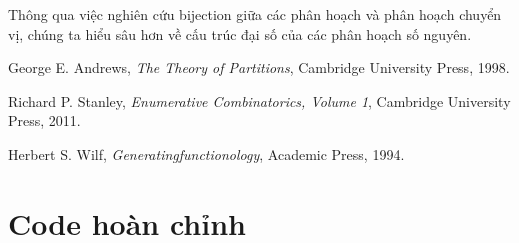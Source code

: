 \documentclass[12pt,a4paper]{article}
\theoremstyle{definition}
\begin{document}
Thông qua việc nghiên cứu bijection giữa các phân hoạch và phân hoạch chuyển vị, chúng ta hiểu sâu hơn về cấu trúc đại số của các phân hoạch số nguyên.

\begin{thebibliography}{9}
George E. Andrews, \textit{The Theory of Partitions}, Cambridge University Press, 1998.

Richard P. Stanley, \textit{Enumerative Combinatorics, Volume 1}, Cambridge University Press, 2011.

Herbert S. Wilf, \textit{Generatingfunctionology}, Academic Press, 1994.
\end{thebibliography}

\appendix
\section{Code hoàn chỉnh}
\end{document}
